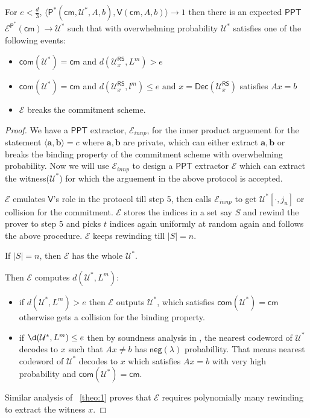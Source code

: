 \documentclass[runningheads]{llncs}
\newcommand{\innp}[2]{\langle #1,#2\rangle}
\def\ppt{\mathsf{PPT}}
\def\extrac{\mathcal{E}} %
\def\prover{\mathsf{P}}
\def\verifier{\mathsf{V}}
\def\RS{\mathsf{RS}} %
\def\cm{\mathsf{cm}} %
\def\com{\mathsf{com}} %
\def\negl{\mathsf{neg}}
\def\oracle{\mathcal{U}^{\RS}}
\def\dec{\mathsf{Dec}}
\def\calU{\mathcal{U}}
\begin{document}
	\begin{theorem}
		For $e < \frac{d}{3} $, $\innp{\prover^*(\cm, \calU^*, A, b)}{\verifier(\cm, A, b)} \rightarrow 1 $ then there is an expected $\ppt$ $\extrac^{\prover^*}(\cm) \rightarrow \calU^*$ such that with overwhelming probability $\calU^*$ satisfies one of the following events:
		\begin{itemize}
			\item $\com(\calU^*)=\cm$ and $d(\oracle_x,L^m) > e $
			\item $\com(\calU^*)=\cm$ and $d(\oracle_x, l^m)\leq e \text{ and } x = \dec(\oracle_x)$ satisfies $ Ax = b$
			\item $\extrac$ breaks the commitment scheme.
		\end{itemize}
	\end{theorem}

	\begin{proof}
	We have a $\ppt$ extractor, $\extrac_{innp}$, for the inner product arguement for the statement $\innp{\bm{a}}{\bm{b}}=c$ where $\bm{a},\bm{b}$ are private, which can either extract $\bm{a}, \bm{b}$ or breaks the binding property of the commitment scheme with overwhelming probability. Now we will use $\extrac_{innp}$ to design a $\ppt$ extractor $\extrac$ which can extract the witness($\calU^*$) for which the arguement in the above protocol is accepted.
	
	 $\extrac$ emulates $\verifier$'s role in the protocol till step 5, then calls $\extrac_{innp}$ to get $\calU^*[\cdot,j_u]$ or collision for the commitment. $\extrac$ stores the indices in a set say $S$ and rewind the prover to step 5 and picks $t$ indices again uniformly at random again and follows the above procedure. $\extrac$ keeps rewinding till $|S|=n$.
	 
	 If $|S|=n$, then $\extrac$ has the whole $\calU^*$.
	 
	 Then $\extrac$ computes $d(\calU^*, L^m)$:
	 \begin{itemize}
	 	\item if $d(\calU^*,L^m) > e$ then $\extrac$ outputs $\calU^*$, which satisfies $\com(\calU^*)=\cm$ otherwise gets a collision for the binding property.
	 	
	 	\item if $\d(\calU^*,L^m) \leq e$ then by soundness analysis in \cite{Ligero2017}, the nearest codeword of $\calU^*$ decodes to $x$ such that $Ax\neq b$ has $\negl(\lambda)$ probabillity. That means nearest codeword of $\calU^*$ decodes to $x$ which satisfies $Ax=b$ with very high probability and $\com(\calU^*)=\cm$.
	 \end{itemize}
 
	 Similar analysis of ~\ref{theo:1} proves that $\extrac$ requires polynomially many rewinding to extract the witness $x$.
	\end{proof}
\end{document}
